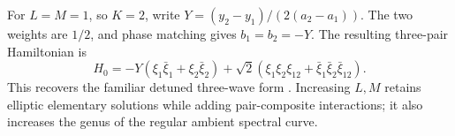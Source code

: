 For $L=M=1$, so $K=2$, write
$Y=(y_2-y_1)/(2(a_2-a_1))$.
The two weights are $1/2$, and phase matching gives
$b_1=b_2=-Y$. The resulting three-pair Hamiltonian is
\begin{equation}\label{eq:BA-three-wave}
 H_0=-Y(\xi_1\bar{\xi}_1+\xi_2\bar{\xi}_2)
 +\sqrt2(\xi_1\xi_2\xi_{12}
             +\bar{\xi}_1\bar{\xi}_2\bar{\xi}_{12}).
\end{equation}
This recovers the familiar detuned three-wave form
\cite{MenyukChenLee1983Integrable}. Increasing $L,M$ retains elliptic
elementary solutions while adding pair-composite interactions; it
also increases the genus of the regular ambient spectral curve.
